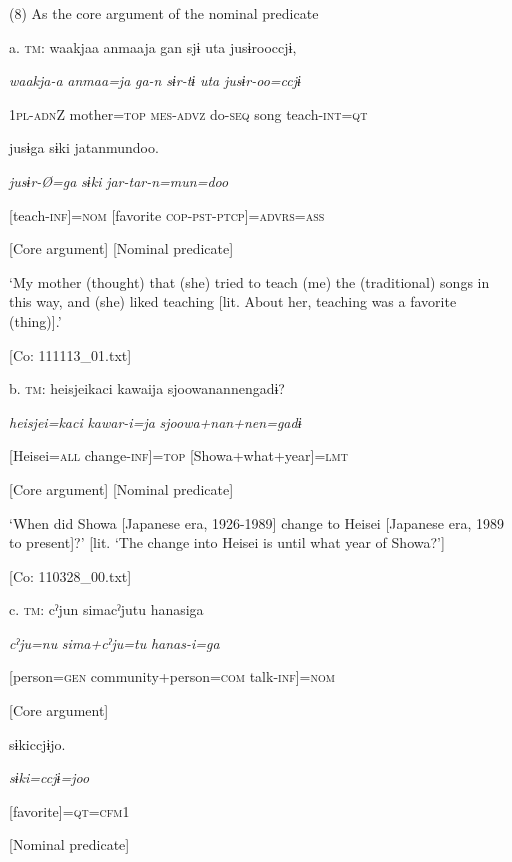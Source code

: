 (8)  As the core argument of the nominal predicate

  a.  \textsc{tm}:  waakjaa  anmaaja  gan  sjɨ  uta  jusɨrooccjɨ,

      \textit{waakja-a}  \textit{anmaa=ja}  \textit{ga-n}  \textit{sɨr-tɨ}  \textit{uta}  \textit{jusɨr-oo=ccjɨ}

      1\textsc{pl}-\textsc{adn}Z  mother=\textsc{top}  \textsc{mes}-\textsc{advz}  do-\textsc{seq}  song  teach-\textsc{int}=\textsc{qt}

      jusɨga  sɨki  jatanmundoo.

      \textit{jusɨr-Ø=ga}  \textit{sɨki}  \textit{jar-tar-n=mun=doo}

      [teach-\textsc{inf}]=\textsc{nom}  [favorite  \textsc{cop}-\textsc{pst}-\textsc{ptcp}]=\textsc{advrs}=\textsc{ass}

      [Core argument]  [Nominal predicate]

      ‘My mother (thought) that (she) tried to teach (me) the (traditional) songs in this way, and (she) liked teaching [lit. About her, teaching was a favorite (thing)].’

      [Co: 111113\_01.txt]

  b.  \textsc{tm}:  heisjeikaci  kawaija  {\textbar}sjoowanannen{\textbar}gadɨ?

      \textit{heisjei=kaci}  \textit{kawar-i=ja}  \textit{sjoowa+nan+nen=gadɨ}

      [Heisei=\textsc{all}  change-\textsc{inf}]=\textsc{top}  [Showa+what+year]=\textsc{lmt}

      [Core argument]  [Nominal predicate]

      ‘When did Showa [Japanese era, 1926-1989] change to Heisei [Japanese era, 1989 to present]?’ [lit. ‘The change into Heisei is until what year of Showa?’]

      [Co: 110328\_00.txt]

  c.  \textsc{tm}:  cˀjun  simacˀjutu  hanasiga

      \textit{cˀju=nu}  \textit{sima+cˀju=tu}  \textit{hanas-i=ga}

      [person=\textsc{gen}  community+person=\textsc{com}  talk-\textsc{inf}]=\textsc{nom}

      [Core argument]  

      sɨkiccjɨjo.

      \textit{sɨki=ccjɨ=joo}

      [favorite]=\textsc{qt}=\textsc{cfm}1

      [Nominal predicate]

